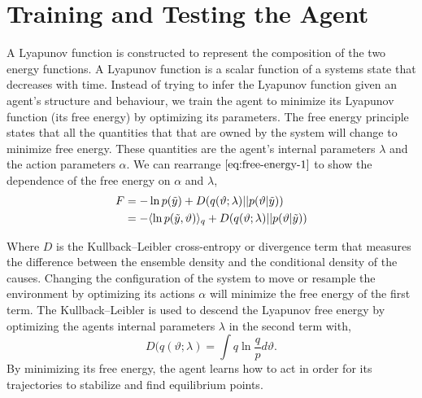 \documentclass{article}
\begin{document}
\section{Training and Testing the Agent}

A Lyapunov function is constructed to represent the composition of the two energy functions. A Lyapunov function is a scalar function of a systems state that decreases with time. Instead of trying to infer the Lyapunov function given an agent's structure and behaviour, we train the agent to minimize its Lyapunov function (its free energy) by optimizing its parameters. The free energy principle states that all the quantities that that are owned by the system will change to minimize free energy. These quantities are the agent's internal parameters $\lambda$ and the action parameters $\alpha$. We can rearrange $\eqref{eq:free-energy-1}$ to show the dependence of the free energy on $\alpha$ and $\lambda$,
\begin{align}\label{eq:free-energy-2}
\begin{split}
F &= -\ln p (\Tilde{y}) + D(q(\vartheta;\lambda) || p(\vartheta|\Tilde{y}))\\
&=  - \langle \ln p(\Tilde{y},\vartheta) \rangle_q + D(q(\vartheta;\lambda) || p(\vartheta|\Tilde{y}))
\end{split}
\end{align}

Where $D$ is the Kullback–Leibler cross-entropy or divergence term that measures the difference between the ensemble density and the conditional density of the causes. Changing the configuration of the system to move or resample the environment by optimizing its actions $\alpha$ will minimize the free energy of the first term. The Kullback–Leibler is used to descend the Lyapunov free energy by optimizing the agents internal parameters $\lambda$ in the second term with,
\[
D(q(\vartheta;\lambda) = \int q \ln \frac{q}{p} d\vartheta.
\]
By minimizing its free energy, the agent learns how to act in order for its trajectories to stabilize and find equilibrium points.




\end{document}
